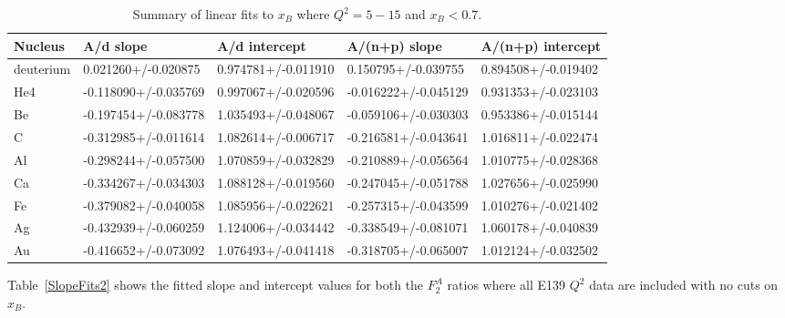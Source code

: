 \documentclass[oneside]{article}
\begin{document}
\begin{table}[htb!]
\caption{\label{SlopeFits1} Summary of linear fits to $x_B$ where $Q^2=5-15$ and $x_B<0.7$.}
\centering
\begin{tabular}{ | C{2.5cm} | C{2cm} | C{2cm} | C{2cm} | C{2cm} | }
 \hline
 \textbf{Nucleus} & \textbf{A/d slope} & \textbf{A/d intercept} & \textbf{A/(n+p) slope} & \textbf{A/(n+p) intercept} \\ 
  \hline
deuterium & 0.021260+/-0.020875 &	0.974781+/-0.011910 & 0.150795+/-0.039755	& 0.894508+/-0.019402 \\ 
  \hline
  He4 &-0.118090+/-0.035769 &	0.997067+/-0.020596 & -0.016222+/-0.045129 &	0.931353+/-0.023103 \\ 
 \hline
 Be &-0.197454+/-0.083778 &	1.035493+/-0.048067 &-0.059106+/-0.030303 &	0.953386+/-0.015144\\ 
  \hline
   C &-0.312985+/-0.011614	&1.082614+/-0.006717 & -0.216581+/-0.043641	&1.016811+/-0.022474 \\ 
  \hline
    Al &-0.298244+/-0.057500	&1.070859+/-0.032829 & -0.210889+/-0.056564	&1.010775+/-0.028368 \\ 
  \hline
 Ca &-0.334267+/-0.034303&	1.088128+/-0.019560 & -0.247045+/-0.051788 &	1.027656+/-0.025990 \\ 
  \hline  
  Fe & -0.379082+/-0.040058	&1.085956+/-0.022621& -0.257315+/-0.043599 &	1.010276+/-0.021402 \\ 
  \hline 
  Ag &-0.432939+/-0.060259&	1.124006+/-0.034442 & -0.338549+/-0.081071	&1.060178+/-0.040839 \\ 
  \hline 
   Au & -0.416652+/-0.073092&	1.076493+/-0.041418 & -0.318705+/-0.065007&	1.012124+/-0.032502\\ 
  \hline 
    \end{tabular}
\end{table} 

Table~\ref{SlopeFits2} shows the fitted slope and intercept values for both the $F_2^A$ ratios where all E139 $Q^2$ data are included with no cuts on $x_B$. 
\end{document}
